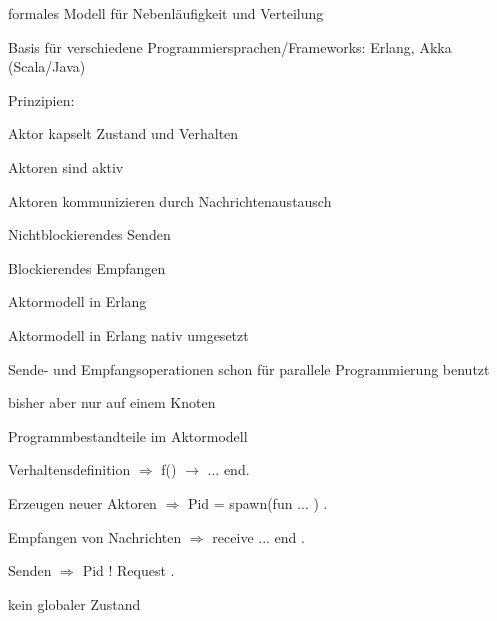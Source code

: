 \documentclass[10pt]{article}
\begin{document}
  \begin{itemize*}
    \item formales Modell für Nebenläufigkeit und Verteilung
    \item Basis für verschiedene Programmiersprachen/Frameworks: Erlang, Akka (Scala/Java)
    \item Prinzipien:
    \begin{itemize*}
      \item Aktor kapselt Zustand und Verhalten
      \item Aktoren sind aktiv
      \item Aktoren kommunizieren durch Nachrichtenaustausch
      \begin{itemize*}
        \item Nichtblockierendes Senden
        \item Blockierendes Empfangen
      \end{itemize*}
    \end{itemize*}
  \end{itemize*}
  
  Aktormodell in Erlang
  \begin{itemize*}
    \item Aktormodell in Erlang nativ umgesetzt
    \begin{itemize*}
      \item Sende- und Empfangsoperationen schon für parallele Programmierung benutzt
      \item bisher aber nur auf einem Knoten
    \end{itemize*}
    \item Programmbestandteile im Aktormodell
    \begin{itemize*}
      \item Verhaltensdefinition $\Rightarrow$ f() $\rightarrow$ ... end.
      \item Erzeugen neuer Aktoren $\Rightarrow$ Pid = spawn(fun ... ) .
      \item Empfangen von Nachrichten $\Rightarrow$ receive ... end .
      \item Senden $\Rightarrow$ Pid ! Request .
    \end{itemize*}
    \item kein globaler Zustand
  \end{itemize*}
  
\end{document}
